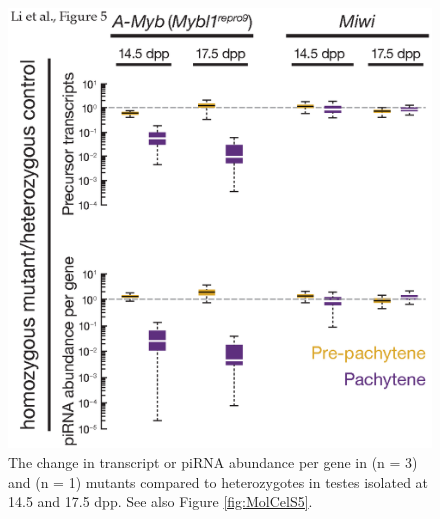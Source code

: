     \begin{figure}[htbp] %
      \centering 
      \includegraphics{Figures/MolCel/MolCel2013_Fig5.eps}
      \caption[Pachytene piRNAs and Precursors Decrease in \amyb{} Mutant Testes]
      {
     	 The change in transcript or piRNA abundance per gene in \amyb{} (n = 3) and \miwi{} (n = 1) mutants compared to heterozygotes in testes isolated at 14.5 and 17.5 dpp. See also Figure \ref{fig:MolCelS5}.
     	 }
      \label{fig:MolCelF5}
   	  \end{figure}
